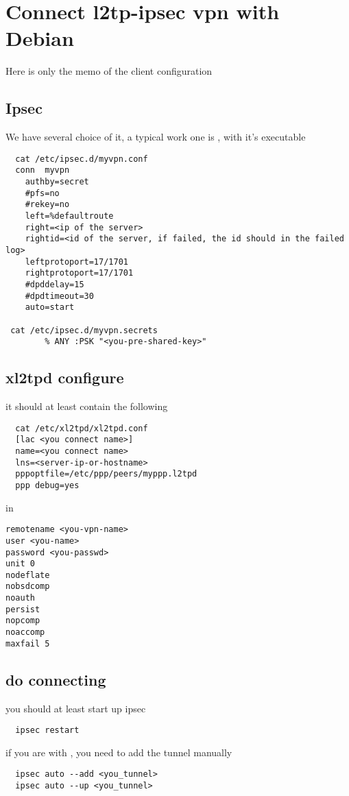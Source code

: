 \chapter{Connect l2tp-ipsec vpn with Debian}

Here is only the memo of the client configuration


\section{Ipsec}
We have several choice of it, a typical work one is , with it's executable 

\begin{lstlisting}
  cat /etc/ipsec.d/myvpn.conf
  conn	myvpn
	authby=secret
	#pfs=no
	#rekey=no
	left=%defaultroute
	right=<ip of the server>
	rightid=<id of the server, if failed, the id should in the failed log>
	leftprotoport=17/1701
	rightprotoport=17/1701
	#dpddelay=15
	#dpdtimeout=30
	auto=start

 cat /etc/ipsec.d/myvpn.secrets
        % ANY :PSK "<you-pre-shared-key>"
\end{lstlisting}

\section{xl2tpd configure}

it should at least contain the following
\begin{lstlisting}
  cat /etc/xl2tpd/xl2tpd.conf
  [lac <you connect name>]
  name=<you connect name>
  lns=<server-ip-or-hostname>
  pppoptfile=/etc/ppp/peers/myppp.l2tpd
  ppp debug=yes
\end{lstlisting}

in 
\begin{lstlisting}
remotename <you-vpn-name>
user <you-name>
password <you-passwd>
unit 0
nodeflate
nobsdcomp
noauth
persist
nopcomp
noaccomp
maxfail 5

\end{lstlisting}

\section{do connecting}
you should at least start up ipsec
\begin{lstlisting}
  ipsec restart
\end{lstlisting}

if you are with , you need to add the tunnel manually
\begin{lstlisting}
  ipsec auto --add <you_tunnel>
  ipsec auto --up <you_tunnel>
\end{lstlisting}

